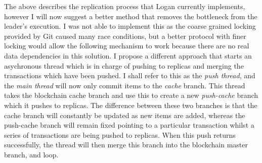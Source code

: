 \documentclass[12pt,a4paper,twoside,openright]{report}
\begin{document}
	The above describes the replication process that Logan currently implements, however I will now suggest a better method that removes the bottleneck from the leader's execution.
	I was not able to implement this as the coarse grained locking provided by Git caused many race conditions, but a better protocol with finer locking would allow the following mechanism to work because there are no real data dependencies in this solution.
	I propose a different approach that starts an asychronous thread which is in charge of pushing to replicas and merging the transactions which have been pushed.
	I shall refer to this as the \textit{push thread}, and the \textit{main thread} will now only commit items to the \textit{cache} branch.
	This thread takes the blockchain cache branch and use this to create a new \textit{push-cache} branch which it pushes to replicas.
	The difference between these two branches is that the cache branch will constantly be updated as new items are added, whereas the push-cache branch will remain fixed pointing to a particular transaction whilst a series of transactions are being pushed to replicas. 
	When this push returns successfully, the thread will then merge this branch into the blockchain master branch, and loop.
\end{document}
